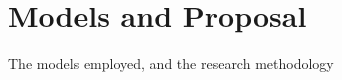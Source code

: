 
\chapter[Models and Proposal]{Models and Proposal}\label{chap:ir}
The models employed, and the research methodology